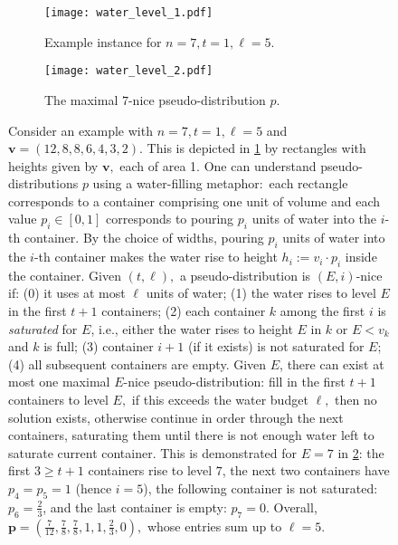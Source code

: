 \documentclass[sigconf,nonacm]{aamas}
\begin{document}
\begin{figure}[t]
    \centering
    \begin{subfigure}[b]{1.00\linewidth}
    \centering
    \texttt{[image: water\_level\_1.pdf]}
    \caption{Example instance for $n = 7, t = 1, \ell = 5.$}
    \label{fig:water-level-1}
    \end{subfigure}
    
    \begin{subfigure}[b]{1.00\linewidth}
    \centering
    \hspace{0.34cm}
    \texttt{[image: water\_level\_2.pdf]}
    \caption{The maximal $7$-nice pseudo-distribution $p.$}
    \label{fig:water-level-2}    
    \end{subfigure}
    \caption{Consider an example with $n = 7, t = 1, \ell = 5$ and $\mathbf{v} = (12, 8, 8, 6, 4, 3, 2).$ This is depicted in \cref{fig:water-level-1} by rectangles with heights given by $\mathbf{v},$ each of area 1. One can understand pseudo-distributions $p$ using a water-filling metaphor:~each rectangle corresponds to a container comprising one unit of volume and each value $p_i \in [0, 1]$ corresponds to pouring $p_i$ units of water into the $i$-th container. By the choice of widths, pouring $p_i$ units of water into the $i$-th container makes the water rise to height $h_i := v_i \cdot p_i$ inside the container. Given $(t, \ell),$ a pseudo-distribution is $(E, i)$-nice if: (0) it uses at most $\ell$ units of water; (1) the water rises to level $E$ in the first $t + 1$ containers; (2) each container $k$ among the first $i$ is \emph{saturated} for $E$, i.e., either the water rises to height $E$ in $k$ or $E < v_k$ and $k$ is full; (3) container $i + 1$ (if it exists) is not saturated for $E$; (4) all subsequent containers are empty. Given $E$, there can exist at most one maximal $E$-nice pseudo-distribution: fill in the first $t + 1$ containers to level $E,$ if this exceeds the water budget $\ell,$ then no solution exists, otherwise continue in order through the next containers, saturating them until there is not enough water left to saturate current container. This is demonstrated for $E = 7$ in \cref{fig:water-level-2}: the first $3 \geq t + 1$ containers rise to level $7$, the next two containers have $p_4 = p_5 = 1$ (hence $i = 5$), the following container is not saturated: $p_6 = \frac{2}{3}$, and the last container is empty: $p_7 = 0.$ Overall, $\mathbf{p} = (\frac{7}{12}, \frac{7}{8}, \frac{7}{8}, 1, 1, \frac{2}{3}, 0),$ whose entries sum up to $\ell = 5.$}  
    \label{fig:water-level}
\end{figure}
\end{document}
